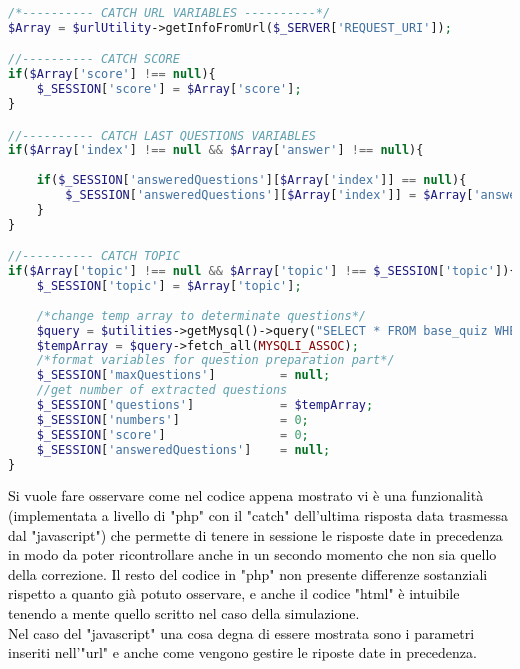 \begin{lstlisting}[language=php]
/*---------- CATCH URL VARIABLES ----------*/
$Array = $urlUtility->getInfoFromUrl($_SERVER['REQUEST_URI']);

//---------- CATCH SCORE
if($Array['score'] !== null){
	$_SESSION['score'] = $Array['score'];
}

//---------- CATCH LAST QUESTIONS VARIABLES
if($Array['index'] !== null && $Array['answer'] !== null){
	
	if($_SESSION['answeredQuestions'][$Array['index']] == null){
		$_SESSION['answeredQuestions'][$Array['index']] = $Array['answer']; 
	} 
}

//---------- CATCH TOPIC 
if($Array['topic'] !== null && $Array['topic'] !== $_SESSION['topic']){
	$_SESSION['topic'] = $Array['topic'];
	
	/*change temp array to determinate questions*/
	$query = $utilities->getMysql()->query("SELECT * FROM base_quiz WHERE (topic = '{$Array['topic']}')");
	$tempArray = $query->fetch_all(MYSQLI_ASSOC);
	/*format variables for question preparation part*/
	$_SESSION['maxQuestions']         = null;
	//get number of extracted questions
	$_SESSION['questions']            = $tempArray;
	$_SESSION['numbers']              = 0;
	$_SESSION['score']                = 0;
	$_SESSION['answeredQuestions']    = null;
}
\end{lstlisting}

\textcolor{black}{Si vuole fare osservare come nel codice appena mostrato vi è una funzionalità (implementata a livello di "php" con il "catch" dell'ultima risposta data trasmessa dal "javascript") che permette di tenere in sessione le risposte date in precedenza in modo da poter ricontrollare anche in un secondo momento che non sia quello della correzione. Il resto del codice in "php" non presente differenze sostanziali rispetto a quanto già potuto osservare, e anche il codice "html" è intuibile tenendo a mente quello scritto nel caso della simulazione.\\
Nel caso del "javascript" una cosa degna di essere mostrata sono i parametri inseriti nell'"url" e anche come vengono gestire le riposte date in precedenza.}\\

